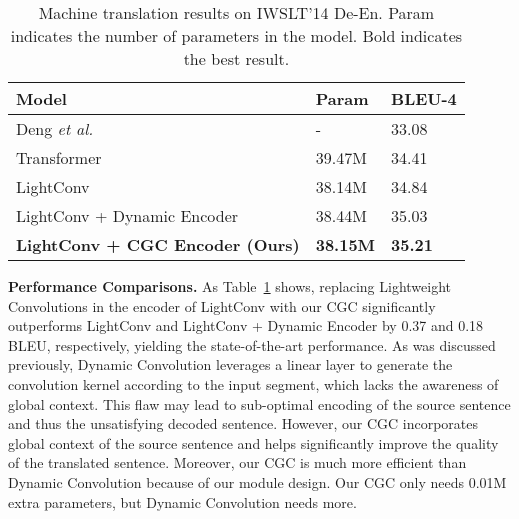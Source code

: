 \documentclass[runningheads]{llncs}
\begin{document}
\begin{table}[t]
\caption{Machine translation results on IWSLT'14 De-En. Param indicates the number of parameters in the model. Bold indicates the best result.}
\label{tab:mt}
\scriptsize
\begin{center}

\begin{tabular}{lll}
\hline
Model  & Param & {BLEU-4} 
\\ \hline 
Deng \textit{et al.}~\cite{deng2018latent} & - & 33.08 \\
Transformer~\cite{vaswani2017attention} & 39.47M & 34.41 \\
\hline
LightConv~\cite{wu2019pay} & 38.14M & 34.84 \\
LightConv + Dynamic Encoder~\cite{wu2019pay} & 38.44M & 35.03 \\
\textbf{LightConv + CGC Encoder (Ours)} & \textbf{38.15M} & \textbf{35.21} \\
\hline
\end{tabular}
\end{center}

\end{table}

\textbf{Performance Comparisons.}
As Table~\ref{tab:mt} shows, replacing Lightweight Convolutions in the encoder of LightConv with our CGC significantly outperforms LightConv and LightConv + Dynamic Encoder by 0.37 and 0.18 BLEU, respectively, yielding the state-of-the-art performance. As was discussed previously, Dynamic Convolution leverages a linear layer to generate the convolution kernel according to the input segment, which lacks the awareness of global context. This flaw may lead to sub-optimal encoding of the source sentence and thus the unsatisfying decoded sentence. However, our CGC incorporates global context of the source sentence and helps significantly improve the quality of the translated sentence. Moreover, our CGC is much more efficient than Dynamic Convolution because of our module design. Our CGC only needs 0.01M extra parameters, but Dynamic Convolution needs  more.





 
\end{document}
